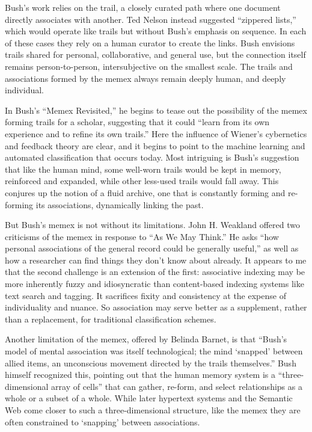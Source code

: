 Bush's work relies on the trail, a closely curated path where one document directly associates with another. Ted Nelson instead suggested ``zippered lists,'' which would operate like trails but without Bush's emphasis on sequence.\autocite[84, 89]{nelson_complex_1965} In each of these cases they rely on a human curator to create the links. Bush envisions trails shared for personal, collaborative, and general use, but the connection itself remains person-to-person, intersubjective on the smallest scale. The trails and associations formed by the memex always remain deeply human, and deeply individual.

In Bush's ``Memex Revisited,'' he begins to tease out the possibility of the memex forming trails for a scholar, suggesting that it could ``learn from its own experience and to refine its own trails.''\autocite[211]{bush_memex_1991} Here the influence of Wiener's cybernetics and feedback theory are clear, and it begins to point to the machine learning and automated classification that occurs today. Most intriguing is Bush's suggestion that like the human mind, some well-worn trails would be kept in memory, reinforced and expanded, while other less-used trails would fall away. This conjures up the notion of a fluid archive, one that is constantly forming and re-forming its associations, dynamically linking the past.

But Bush's memex is not without its limitations. John H. Weakland offered two criticisms of the memex in response to ``As We May Think.'' He asks ``how personal associations of the general record could be generally useful,'' as well as how a researcher can find things they don't know about already.\autocite[217]{nyce_innovation_1989} It appears to me that the second challenge is an extension of the first: associative indexing may be more inherently fuzzy and idiosyncratic than content-based indexing systems like text search and tagging. It sacrifices fixity and consistency at the expense of individuality and nuance. So association may serve better as a supplement, rather than a replacement, for traditional classification schemes.

Another limitation of the memex, offered by Belinda Barnet, is that ``Bush's model of mental association was itself technological; the mind `snapped' between allied items, an unconscious movement directed by the trails themselves.''\autocite{barnet_technical_2008} Bush himself recognized this, pointing out that the human memory system is a ``three-dimensional array of cells'' that can gather, re-form, and select relationships as a whole or a subset of a whole.\autocite[209]{bush_memex_1991} While later hypertext systems and the Semantic Web come closer to such a three-dimensional structure, like the memex they are often constrained to `snapping' between associations.

